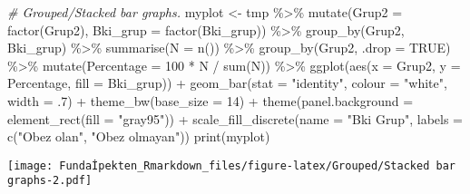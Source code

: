 \documentclass[
]{article}
\newenvironment{Shaded}{\begin{snugshade}}{\end{snugshade}}
\newcommand{\AttributeTok}[1]{\textcolor[rgb]{0.77,0.63,0.00}{#1}}
\newcommand{\CommentTok}[1]{\textcolor[rgb]{0.56,0.35,0.01}{\textit{#1}}}
\newcommand{\ConstantTok}[1]{\textcolor[rgb]{0.00,0.00,0.00}{#1}}
\newcommand{\DecValTok}[1]{\textcolor[rgb]{0.00,0.00,0.81}{#1}}
\newcommand{\FunctionTok}[1]{\textcolor[rgb]{0.00,0.00,0.00}{#1}}
\newcommand{\NormalTok}[1]{#1}
\newcommand{\OtherTok}[1]{\textcolor[rgb]{0.56,0.35,0.01}{#1}}
\newcommand{\SpecialCharTok}[1]{\textcolor[rgb]{0.00,0.00,0.00}{#1}}
\newcommand{\StringTok}[1]{\textcolor[rgb]{0.31,0.60,0.02}{#1}}
\begin{document}
\begin{Shaded}
\begin{Highlighting}[]
\CommentTok{\# Grouped/Stacked bar graphs.}
\NormalTok{myplot }\OtherTok{\textless{}{-}}\NormalTok{ tmp }\SpecialCharTok{\%\textgreater{}\%}
  \FunctionTok{mutate}\NormalTok{(}\AttributeTok{Grup2 =} \FunctionTok{factor}\NormalTok{(Grup2), }\AttributeTok{Bki\_grup =} \FunctionTok{factor}\NormalTok{(Bki\_grup)) }\SpecialCharTok{\%\textgreater{}\%}
  \FunctionTok{group\_by}\NormalTok{(Grup2, Bki\_grup) }\SpecialCharTok{\%\textgreater{}\%}
  \FunctionTok{summarise}\NormalTok{(}\AttributeTok{N =} \FunctionTok{n}\NormalTok{()) }\SpecialCharTok{\%\textgreater{}\%}
  \FunctionTok{group\_by}\NormalTok{(Grup2, }\AttributeTok{.drop =} \ConstantTok{TRUE}\NormalTok{) }\SpecialCharTok{\%\textgreater{}\%}
  \FunctionTok{mutate}\NormalTok{(}\AttributeTok{Percentage =} \DecValTok{100} \SpecialCharTok{*}\NormalTok{ N }\SpecialCharTok{/} \FunctionTok{sum}\NormalTok{(N)) }\SpecialCharTok{\%\textgreater{}\%}
  \FunctionTok{ggplot}\NormalTok{(}\FunctionTok{aes}\NormalTok{(}\AttributeTok{x =}\NormalTok{ Grup2, }\AttributeTok{y =}\NormalTok{ Percentage, }\AttributeTok{fill =}\NormalTok{ Bki\_grup)) }\SpecialCharTok{+} 
    \FunctionTok{geom\_bar}\NormalTok{(}\AttributeTok{stat =} \StringTok{"identity"}\NormalTok{, }\AttributeTok{colour =} \StringTok{"white"}\NormalTok{, }\AttributeTok{width =}\NormalTok{ .}\DecValTok{7}\NormalTok{) }\SpecialCharTok{+}
    \FunctionTok{theme\_bw}\NormalTok{(}\AttributeTok{base\_size =} \DecValTok{14}\NormalTok{) }\SpecialCharTok{+} 
    \FunctionTok{theme}\NormalTok{(}\AttributeTok{panel.background =} \FunctionTok{element\_rect}\NormalTok{(}\AttributeTok{fill =} \StringTok{"gray95"}\NormalTok{)) }\SpecialCharTok{+} 
    \FunctionTok{scale\_fill\_discrete}\NormalTok{(}\AttributeTok{name =} \StringTok{"Bki Grup"}\NormalTok{, }
                        \AttributeTok{labels =} \FunctionTok{c}\NormalTok{(}\StringTok{"Obez olan"}\NormalTok{, }\StringTok{"Obez olmayan"}\NormalTok{))}
\FunctionTok{print}\NormalTok{(myplot)}
\end{Highlighting}
\end{Shaded}

\texttt{[image: Fundaİpekten\_Rmarkdown\_files/figure-latex/Grouped/Stacked bar graphs-2.pdf]}
\end{document}
